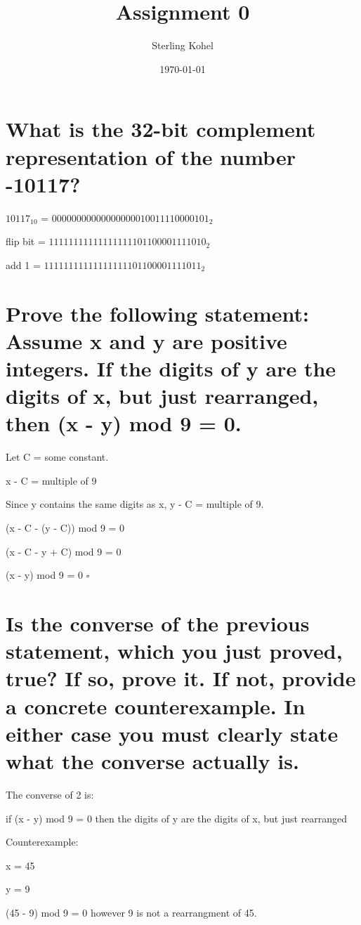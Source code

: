 \documentclass[11pt]{article}
\title{\textbf{Assignment 0}}
\author{Sterling Kohel}
\date{\today}
\begin{document}
\maketitle


\section{What is the  32-bit complement  representation of the number -10117?}

\hspace{2ex} $10117_{10}$  = $0000 0000 0000 0000 0010 0111 1000 0101_{2}$

flip bit  = $1111 1111 1111 1111 1101 1000 0111 1010_{2}$

\hspace{1.3ex}add 1 = $1111 1111 1111 1111 1101 1000 0111 1011_{2}$

\section{Prove the following statement:  Assume x and y are positive integers.  If the digits of y are the digits of x, but just rearranged, then (x - y) mod 9 = 0.}

\hspace{3.2ex}Let C = some constant.

x - C = multiple of 9

Since y contains the same digits as x, y - C = multiple of 9.

(x - C - (y - C)) mod 9 = 0

(x - C - y + C) mod 9 = 0

(x - y) mod 9 = 0 $\square$

\section{Is the converse of the previous statement, which you just proved, true?  If so, prove it.  If not, provide a concrete counterexample.  In either case you must clearly state what the converse actually is.}

The converse of 2 is:

 if (x - y) mod 9 = 0 then the digits of y are the digits of x, but just rearranged 
 
 Counterexample:
 
 x = 45
 
 y = 9
 
 (45 - 9) mod 9 = 0 
 however 9 is not a rearrangment of 45.
\end{document}
